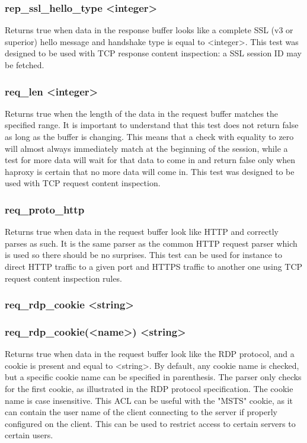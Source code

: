 \subsubsection[rep\_ssl\_hello\_type]{rep\_ssl\_hello\_type <integer>}
  Returns true when data in the response buffer looks like a complete SSL (v3
  or superior) hello message and handshake type is equal to <integer>.
  This test was designed to be used with TCP response content inspection: a
  SSL session ID may be fetched.

\subsubsection[req\_len]{req\_len <integer>}
  Returns true when the length of the data in the request buffer matches the
  specified range. It is important to understand that this test does not
  return false as long as the buffer is changing. This means that a check with
  equality to zero will almost always immediately match at the beginning of the
  session, while a test for more data will wait for that data to come in and
  return false only when haproxy is certain that no more data will come in.
  This test was designed to be used with TCP request content inspection.

\subsubsection[req\_proto\_http]{req\_proto\_http}
  Returns true when data in the request buffer look like HTTP and correctly
  parses as such. It is the same parser as the common HTTP request parser which
  is used so there should be no surprises. This test can be used for instance
  to direct HTTP traffic to a given port and HTTPS traffic to another one
  using TCP request content inspection rules.

\subsubsection[req\_rdp\_cookie]{req\_rdp\_cookie <string>}
\subsubsection*{req\_rdp\_cookie(<name>) <string>}
  Returns true when data in the request buffer look like the RDP protocol, and
  a cookie is present and equal to <string>. By default, any cookie name is
  checked, but a specific cookie name can be specified in parenthesis. The
  parser only checks for the first cookie, as illustrated in the RDP protocol
  specification. The cookie name is case insensitive. This ACL can be useful
  with the "MSTS" cookie, as it can contain the user name of the client
  connecting to the server if properly configured on the client. This can be
  used to restrict access to certain servers to certain users.

